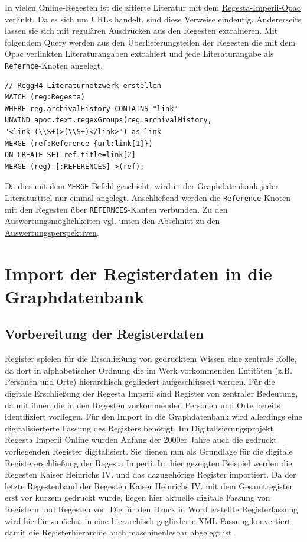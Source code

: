 \documentclass[ngerman,]{scrreprt}
\begin{document}
In vielen Online-Regesten ist die zitierte Literatur mit dem \href{http://opac.regesta-imperii.de/lang_de/}{Regesta-Imperii-Opac} verlinkt. Da es sich um URLs handelt, sind diese Verweise eindeutig. Andererseits lassen sie sich mit regulären Ausdrücken aus den Regesten extrahieren. Mit folgendem Query werden aus den Überlieferungsteilen der Regesten die mit dem Opac verlinkten Literaturangaben extrahiert und jede Literaturangabe als \texttt{Refernce}-Knoten angelegt.

\begin{verbatim}
// ReggH4-Literaturnetzwerk erstellen
MATCH (reg:Regesta)
WHERE reg.archivalHistory CONTAINS "link"
UNWIND apoc.text.regexGroups(reg.archivalHistory,
"<link (\\S+)>(\\S+)</link>") as link
MERGE (ref:Reference {url:link[1]})
ON CREATE SET ref.title=link[2]
MERGE (reg)-[:REFERENCES]->(ref);
\end{verbatim}

Da dies mit dem \texttt{MERGE}-Befehl geschieht, wird in der Graphdatenbank jeder Literaturtitel nur einmal angelegt. Anschließend werden die \texttt{Reference}-Knoten mit den Regesten über \texttt{REFERNCES}-Kanten verbunden. Zu den Auswertungsmöglichkeiten vgl. unten den Abschnitt zu den \protect\hyperlink{ux5cux23Auswertungsperspektiven}{Auswertungsperspektiven}.

\section{Import der Registerdaten in die Graphdatenbank}\label{import-der-registerdaten-in-die-graphdatenbank}

\subsection{Vorbereitung der Registerdaten}\label{vorbereitung-der-registerdaten}

Register spielen für die Erschließung von gedrucktem Wissen eine zentrale Rolle, da dort in alphabetischer Ordnung die im Werk vorkommenden Entitäten (z.B. Personen und Orte) hierarchisch gegliedert aufgeschlüsselt werden. Für die digitale Erschließung der Regesta Imperii sind Register von zentraler Bedeutung, da mit ihnen die in den Regesten vorkommenden Personen und Orte bereits identifiziert vorliegen. Für den Import in die Graphdatenbank wird allerdings eine digitalisierterte Fassung des Registers benötigt. Im Digitalisierungsprojekt Regesta Imperii Online wurden Anfang der 2000er Jahre auch die gedruckt vorliegenden Register digitalisiert. Sie dienen nun als Grundlage für die digitale Registererschließung der Regesta Imperii. Im hier gezeigten Beispiel werden die Regesten Kaiser Heinrichs IV. und das dazugehörige Register importiert. Da der letzte Regestenband der Regesten Kaiser Heinrichs IV. mit dem Gesamtregister erst vor kurzem gedruckt wurde, liegen hier aktuelle digitale Fassung von Registern und Regesten vor. Die für den Druck in Word erstellte Registerfassung wird hierfür zunächst in eine hierarchisch gegliederte XML-Fassung konvertiert, damit die Registerhierarchie auch maschinenlesbar abgelegt ist.
\end{document}
